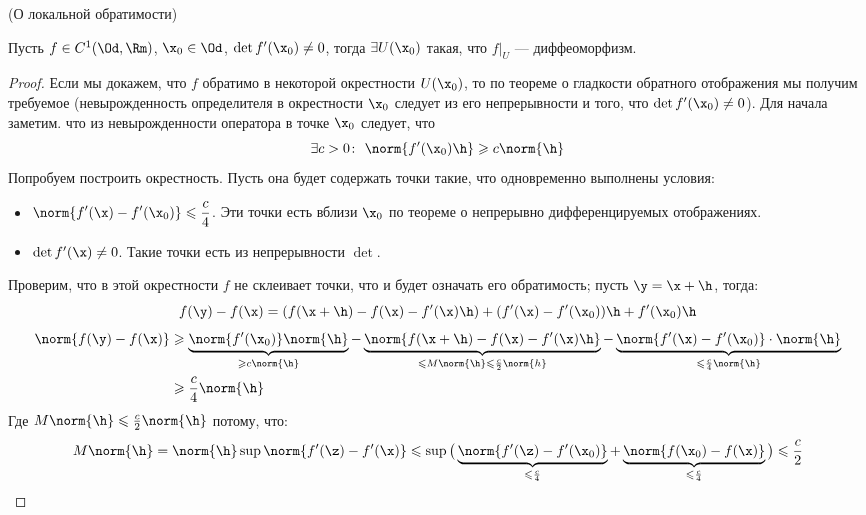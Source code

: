 \begin{theorem}(О локальной обратимости)

    Пусть $f \in C^1(\Od, \Rm)$, $\x_0 \in \Od$, $\det{f'(\x_0)} \neq 0$,
    тогда $\exists U(\x_0)$ такая, что $f\big|_U$ --- диффеоморфизм.
\end{theorem}
\begin{proof}
    Если мы докажем, что $f$ обратимо в некоторой окрестности $U(\x_0)$,
    то по теореме о гладкости обратного отображения мы получим требуемое
    (невырожденность определителя в окрестности $\x_0$ следует из его непрерывности
    и того, что $\det{f'(\x_0)} \neq 0$). Для начала заметим. что из невырожденности
    оператора в точке $\x_0$ следует, что
\[
    \exists c > 0\colon~ \norm{f'(\x_0)\h} \geqslant c \norm{\h}
\]
    Попробуем построить окрестность. Пусть она будет содержать точки такие, что
    одновременно выполнены условия:
    \begin{itemize}
        \item $\displaystyle \norm{f'(\x) - f'(\x_0)} \leqslant \frac{c}{4}$.
            Эти точки есть вблизи $\x_0$ по теореме о непрерывно дифференцируемых
            отображениях.
        \item $\det{f'(\x)} \neq 0$.
            Такие точки есть из непрерывности $\det$.
    \end{itemize}
    Проверим, что в этой окрестности $f$ не склеивает точки, что и будет означать
    его обратимость; пусть $\y = \x + \h$, тогда:
\[
    f(\y) - f(\x) = (f(\x + \h) - f(\x) - f'(\x)\h) + (f'(\x) - f'(\x_0))\h
    + f'(\x_0)\h
\]
\begin{align*}
    \norm{f(\y) - f(\x)} &\geqslant \underbrace{\norm{f'(\x_0)} \norm{\h}}
    _{\geqslant c \norm{\h}} -
    \underbrace{\norm{f(\x + \h) - f(\x) - f'(\x)\h}}_{\leqslant M \norm{\h}
    \leqslant \frac{c}{2} \norm{h}}
    - \underbrace{\norm{f'(\x) - f'(\x_0)} \cdot \norm{\h}}_{\leqslant \frac{c}{4}
    \norm{\h}} \\
    &\geqslant \frac{c}{4} \norm{\h}
\end{align*}
    Где $M \norm{\h} \leqslant \frac{c}{2} \norm{\h}$ потому, что:
\[
    M \norm{\h} = \norm{\h} \sup{\norm{f'(\z) - f'(\x)}} \leqslant
    \sup{\big(\underbrace{\norm{f'(\z) - f'(\x_0)}}_{\leqslant \frac{c}{4}} + \underbrace{\norm{f(\x_0) - f(\x)}}_{\leqslant \frac{c}{4}}\big)} \leqslant
    \frac{c}{2}
\]
\end{proof}

